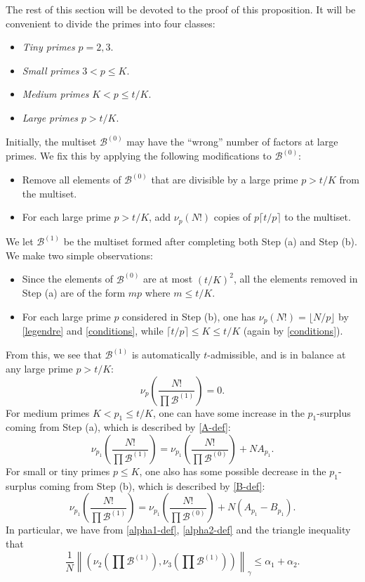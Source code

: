 \documentclass[10pt,a4paper,reqno]{amsart}
\numberwithin{equation}{section}
\theoremstyle{plain}
\theoremstyle{definition}
\newcommand\tuple{{\mathcal B}}
\begin{document}
The rest of this section will be devoted to the proof of this proposition.  It will be convenient to divide the primes into four classes:
  \begin{itemize}
    \item \emph{Tiny primes} $p=2,3$.
    \item \emph{Small primes} $3 < p \leq K$.
    \item \emph{Medium primes} $K < p \leq t/K$.
    \item \emph{Large primes} $p > t/K$.
    \end{itemize}
Initially, the multiset $\tuple^{(0)}$ may have the ``wrong'' number of factors at large primes.  We fix this by applying the following modifications to $\tuple^{(0)}$:
\begin{itemize}
  \item[(a)] Remove all elements of $\tuple^{(0)}$ that are divisible by a large prime $p > t/K$ from the multiset.
  \item[(b)] For each large prime $p > t/K$, add $\nu_p(N!)$ copies of $p \lceil t/p \rceil$ to the multiset.
\end{itemize}
We let $\tuple^{(1)}$ be the multiset formed after completing both Step (a) and Step (b).  We make two simple observations:
\begin{itemize}
\item[(A)] Since the elements of $\tuple^{(0)}$ are at most $(t/K)^2$, all the elements removed in Step (a) are of the form $mp$ where $m \leq t/K$.
\item[(B)] For each large prime $p$ considered in Step (b),  one has $\nu_p(N!) = \lfloor N/p \rfloor$ by \eqref{legendre} and \eqref{conditions}, while $\lceil t/p \rceil \leq K \leq t/K$ (again by \eqref{conditions}).  
\end{itemize}
From this, we see that $\tuple^{(1)}$ is automatically $t$-admissible, and is in balance at any large prime $p > t/K$:
$$ \nu_p\left(\frac{N!}{\prod \tuple^{(1)}}\right) = 0.$$
For medium primes $K < p_1 \leq t/K$, one can have some increase in the $p_1$-surplus coming from Step (a), which is described by \eqref{A-def}:
$$ \nu_{p_1}\left(\frac{N!}{\prod \tuple^{(1)}}\right) = \nu_{p_1}\left(\frac{N!}{\prod \tuple^{(0)}}\right) + NA_{p_1}.$$
For small or tiny primes $p \leq K$, one also has some possible decrease in the $p_1$-surplus coming from Step (b), which is described by \eqref{B-def}:
$$ \nu_{p_1}\left(\frac{N!}{\prod \tuple^{(1)}}\right) = \nu_{p_1}\left(\frac{N!}{\prod \tuple^{(0)}}\right) + N(A_{p_1} - B_{p_1}).$$
In particular, we have from \eqref{alpha1-def}, \eqref{alpha2-def} and the triangle inequality that
\begin{equation}\label{alpha-1}
\frac{1}{N} \left\|\left( \nu_2\left(\prod \tuple^{(1)}\right), \nu_3\left(\prod \tuple^{(1)}\right)\right)\right\|_\gamma \leq \alpha_1 + \alpha_2.
\end{equation}
\end{document}
